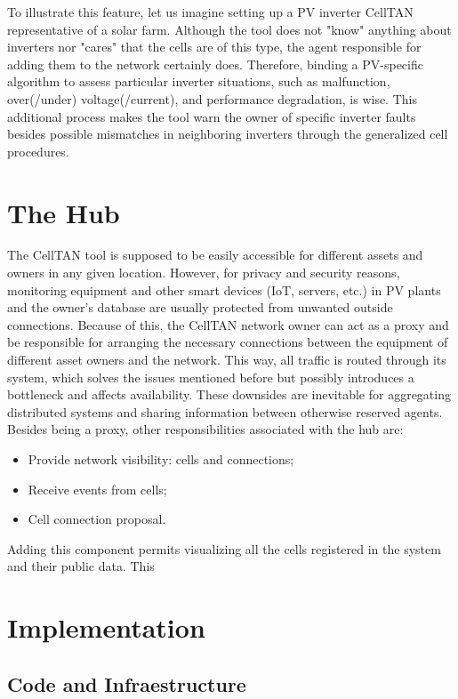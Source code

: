 To illustrate this feature, let us imagine setting up a PV inverter CellTAN representative of a solar farm. Although the tool does not "know" anything about inverters nor "cares" that the cells are of this type, the agent responsible for adding them to the network certainly does. Therefore, binding a PV-specific algorithm to assess particular inverter situations, such as malfunction, over(/under) voltage(/current), and performance degradation, is wise. This additional process makes the tool warn the owner of specific inverter faults besides possible mismatches in neighboring inverters through the generalized cell procedures.

\section{The Hub}

The CellTAN tool is supposed to be easily accessible for different assets and owners in any given location. However, for privacy and security reasons, monitoring equipment and other smart devices (IoT, servers, etc.) in PV plants and the owner's database are usually protected from unwanted outside connections. Because of this, the CellTAN network owner can act as a proxy and be responsible for arranging the necessary connections between the equipment of different asset owners and the network. This way, all traffic is routed through its system, which solves the issues mentioned before but possibly introduces a bottleneck and affects availability. These downsides are inevitable for aggregating distributed systems and sharing information between otherwise reserved agents. Besides being a proxy, other responsibilities associated with the hub are:

\begin{itemize}
    \item Provide network visibility: cells and connections;
    \item Receive events from cells;
    \item Cell connection proposal.
\end{itemize}

Adding this component permits visualizing all the cells registered in the system and their public data. This 

\section{Implementation}

\subsection{Code and Infraestructure}

